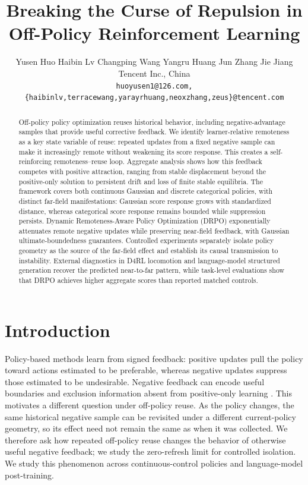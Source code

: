 \documentclass{article}
\title{Breaking the Curse of Repulsion in Off-Policy Reinforcement Learning}
\author{
Yusen Huo \quad Haibin Lv \quad Changping Wang \quad Yangru Huang \quad Jun Zhang \quad Jie Jiang \\
Tencent Inc., China \\
{\small\texttt{huoyusen1@126.com, \{haibinlv,terracewang,yarayrhuang,neoxzhang,zeus\}@tencent.com}}
}
\theoremstyle{plain}
\theoremstyle{definition}
\theoremstyle{remark}
\begin{document}
\maketitle
\lhead{}

\begin{abstract}
Off-policy policy optimization reuses historical behavior, including negative-advantage samples that provide useful corrective feedback. We identify learner-relative remoteness as a key state variable of reuse: repeated updates from a fixed negative sample can make it increasingly remote without weakening its score response. This creates a self-reinforcing remoteness--reuse loop. Aggregate analysis shows how this feedback competes with positive attraction, ranging from stable displacement beyond the positive-only solution to persistent drift and loss of finite stable equilibria. The framework covers both continuous Gaussian and discrete categorical policies, with distinct far-field manifestations: Gaussian score response grows with standardized distance, whereas categorical score response remains bounded while suppression persists. Dynamic Remoteness-Aware Policy Optimization (DRPO) exponentially attenuates remote negative updates while preserving near-field feedback, with Gaussian ultimate-boundedness guarantees. Controlled experiments separately isolate policy geometry as the source of the far-field effect and establish its causal transmission to instability. External diagnostics in D4RL locomotion and language-model structured generation recover the predicted near-to-far pattern, while task-level evaluations show that DRPO achieves higher aggregate scores than reported matched controls.
\end{abstract}

\section{Introduction}
\label{sec:introduction}


Policy-based methods learn from signed feedback: positive updates pull the
policy toward actions estimated to be preferable, whereas negative updates
suppress those estimated to be undesirable. Negative feedback can encode useful boundaries and exclusion information
absent from positive-only learning \citep{zhu2025negative,song2025good}. This motivates a different question under off-policy reuse. As the policy changes, the same historical negative sample can be revisited under a different current-policy geometry, so its effect need not remain the same as when it was collected. We therefore ask how repeated off-policy reuse changes the behavior of otherwise useful negative feedback; we study the zero-refresh limit for controlled isolation. We study this phenomenon across continuous-control policies and language-model post-training.
\end{document}
